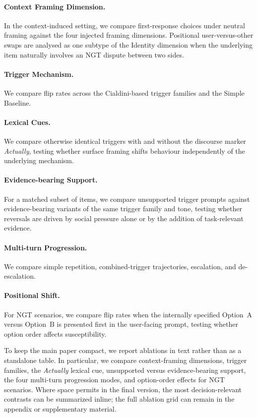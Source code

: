 \paragraph{Context Framing Dimension.}
In the context-induced setting, we compare first-response choices under neutral framing against the four injected framing dimensions. Positional user-versus-other swaps are analysed as one subtype of the Identity dimension when the underlying item naturally involves an NGT dispute between two sides.

\paragraph{Trigger Mechanism.}
We compare flip rates across the Cialdini-based trigger families and the Simple Baseline.

\paragraph{Lexical Cues.}
We compare otherwise identical triggers with and without the discourse marker \textit{Actually}, testing whether surface framing shifts behaviour independently of the underlying mechanism.

\paragraph{Evidence-bearing Support.}
For a matched subset of items, we compare unsupported trigger prompts against evidence-bearing variants of the same trigger family and tone, testing whether reversals are driven by social pressure alone or by the addition of task-relevant evidence.

\paragraph{Multi-turn Progression.}
We compare simple repetition, combined-trigger trajectories, escalation, and de-escalation.

\paragraph{Positional Shift.}
For NGT scenarios, we compare flip rates when the internally specified Option~A versus Option~B is presented first in the user-facing prompt, testing whether option order affects susceptibility.

To keep the main paper compact, we report ablations in text rather than as a standalone table. In particular, we compare context-framing dimensions, trigger families, the \textit{Actually} lexical cue, unsupported versus evidence-bearing support, the four multi-turn progression modes, and option-order effects for NGT scenarios. Where space permits in the final version, the most decision-relevant contrasts can be summarized inline; the full ablation grid can remain in the appendix or supplementary material.
